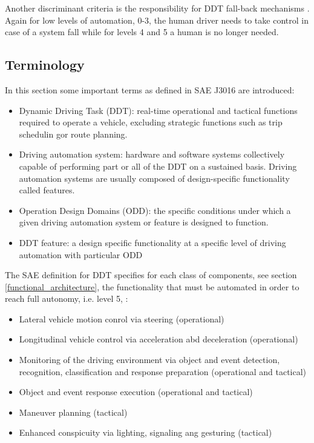 Another discriminant criteria is the responsibility for DDT fall-back mechanisms \cite{Serban}. Again for low levels of automation, 0-3, the human
driver needs to take control in case of a system fall while for levels 4 and 5 a human is no longer needed.  


\subsection{Terminology}
In this section some important terms as defined in SAE J3016 are introduced:

\begin{itemize}
\item Dynamic Driving Task (DDT): real-time operational and tactical functions required to operate a vehicle, excluding strategic functions such as
trip schedulin gor route planning.
\item Driving automation system: hardware and software systems collectively capable of performing part or all of the DDT on
a sustained basis. Driving automation systems are usually composed of design-specific functionality called features.
\item Operation Design Domains (ODD): the specific conditions under which a given driving automation system or feature is designed to function.
\item DDT feature: a design specific functionality at a specific level of driving automation with particular ODD
\end{itemize}

The SAE definition for DDT specifies for each class of components, see section \ref{functional_architecture}, the functionality that must
be automated in order to reach full autonomy, i.e. level 5, \cite{Serban}:

\begin{itemize}
\item Lateral vehicle motion conrol via steering (operational)
\item Longitudinal vehicle control via acceleration abd deceleration (operational)  
\item Monitoring of the driving environment via object and event detection, recognition, classification and response preparation (operational and tactical)
\item Object and event response execution (operational and tactical)
\item Maneuver planning (tactical)
\item Enhanced conspicuity via lighting, signaling ang gesturing (tactical)
\end{itemize}


